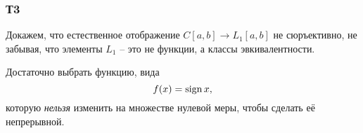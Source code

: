 \subsubsection*{Т3}

Докажем, что естественное отображение $C[a, b] \to L_1[a,b]$ не сюръективно, не забывая, что элементы $L_1$ -- это не функции, а классы эвкивалентности. 

Достаточно выбрать функцию, вида
\begin{equation*}
    f(x) = \mathop{\mathrm{sign}}\nolimits x, 
\end{equation*}
которую \textit{нельзя} изменить на множестве нулевой меры, чтобы сделать её непрерывной. 